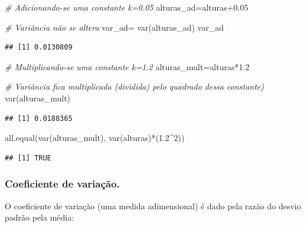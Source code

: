 \documentclass[
]{book}
\newenvironment{Shaded}{\begin{snugshade}}{\end{snugshade}}
\newcommand{\CommentTok}[1]{\textcolor[rgb]{0.56,0.35,0.01}{\textit{#1}}}
\newcommand{\DecValTok}[1]{\textcolor[rgb]{0.00,0.00,0.81}{#1}}
\newcommand{\FloatTok}[1]{\textcolor[rgb]{0.00,0.00,0.81}{#1}}
\newcommand{\FunctionTok}[1]{\textcolor[rgb]{0.00,0.00,0.00}{#1}}
\newcommand{\NormalTok}[1]{#1}
\newcommand{\OtherTok}[1]{\textcolor[rgb]{0.56,0.35,0.01}{#1}}
\newcommand{\SpecialCharTok}[1]{\textcolor[rgb]{0.00,0.00,0.00}{#1}}
\begin{document}
\hfill\break

\begin{Shaded}
\begin{Highlighting}[]
\CommentTok{\# Adicionando{-}se uma constante k=0.05}
\NormalTok{alturas\_ad}\OtherTok{=}\NormalTok{alturas}\FloatTok{+0.05}

\CommentTok{\# Variância não se altera}
\NormalTok{var\_ad}\OtherTok{=} \FunctionTok{var}\NormalTok{(alturas\_ad)}
\NormalTok{var\_ad}
\end{Highlighting}
\end{Shaded}

\begin{verbatim}
## [1] 0.0130809
\end{verbatim}

\begin{Shaded}
\begin{Highlighting}[]
\CommentTok{\# Multiplicando{-}se uma constante k=1.2}
\NormalTok{alturas\_mult}\OtherTok{=}\NormalTok{alturas}\SpecialCharTok{*}\FloatTok{1.2}

\CommentTok{\# Variância fica multiplicada (dividida) pelo quadrado dessa constante)}
\FunctionTok{var}\NormalTok{(alturas\_mult)}
\end{Highlighting}
\end{Shaded}

\begin{verbatim}
## [1] 0.0188365
\end{verbatim}

\begin{Shaded}
\begin{Highlighting}[]
\FunctionTok{all.equal}\NormalTok{(}\FunctionTok{var}\NormalTok{(alturas\_mult), }\FunctionTok{var}\NormalTok{(alturas)}\SpecialCharTok{*}\NormalTok{(}\FloatTok{1.2}\SpecialCharTok{\^{}}\DecValTok{2}\NormalTok{)) }
\end{Highlighting}
\end{Shaded}

\begin{verbatim}
## [1] TRUE
\end{verbatim}

\hypertarget{coeficiente-de-variauxe7uxe3o.}{%
\subsubsection{Coeficiente de variação.}\label{coeficiente-de-variauxe7uxe3o.}}

\hfill\break

O coeficiente de variação (uma medida adimensional) é dado pela razão do desvio padrão pela média:
\end{document}
